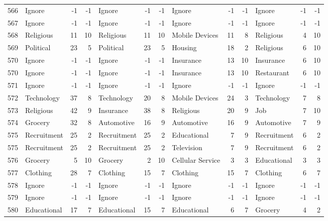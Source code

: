 \begin{figure}[htbp]
\begin{tabular}{rlrrlrrlrrlrr}
    566   & Ignore & -1    & -1    & Ignore & -1    & -1    & Ignore & -1    & -1    & Ignore & -1    & -1 \\
    567   & Ignore & -1    & -1    & Ignore & -1    & -1    & Ignore & -1    & -1    & Ignore & -1    & -1 \\
    568   & Religious & 11    & 10    & Religious & 11    & 10    & Mobile Devices & 11    & 8     & Religious & 4     & 10 \\
    569   & Political & 23    & 5     & Political & 23    & 5     & Housing & 18    & 2     & Religious & 6     & 10 \\
    570   & Ignore & -1    & -1    & Ignore & -1    & -1    & Insurance & 13    & 10    & Insurance & 6     & 10 \\
    570   & Ignore & -1    & -1    & Ignore & -1    & -1    & Insurance & 13    & 10    & Restaurant & 6     & 10 \\
    571   & Ignore & -1    & -1    & Ignore & -1    & -1    & Ignore & -1    & -1    & Ignore & -1    & -1 \\
    572   & Technology & 37    & 8     & Technology & 20    & 8     & Mobile Devices & 24    & 3     & Technology & 7     & 8 \\
    573   & Religious & 42    & 9     & Insurance & 38    & 8     & Religious & 20    & 9     & Job   & 7     & 10 \\
    574   & Grocery & 32    & 8     & Automotive & 16    & 9     & Automotive & 16    & 9     & Automotive & 7     & 9 \\
    575   & Recruitment & 25    & 2     & Recruitment & 25    & 2     & Educational & 7     & 9     & Recruitment & 6     & 2 \\
    575   & Recruitment & 25    & 2     & Recruitment & 25    & 2     & Television & 7     & 9     & Recruitment & 6     & 2 \\
    576   & Grocery & 5     & 10    & Grocery & 2     & 10    & Cellular Service & 3     & 3     & Educational & 3     & 3 \\
    577   & Clothing & 28    & 7     & Clothing & 15    & 7     & Clothing & 15    & 7     & Clothing & 6     & 7 \\
    578   & Ignore & -1    & -1    & Ignore & -1    & -1    & Ignore & -1    & -1    & Ignore & -1    & -1 \\
    579   & Ignore & -1    & -1    & Ignore & -1    & -1    & Ignore & -1    & -1    & Ignore & -1    & -1 \\
    580   & Educational & 17    & 7     & Educational & 15    & 7     & Educational & 6     & 7     & Grocery & 4     & 2 \\

\end{tabular}
\end{figure}

